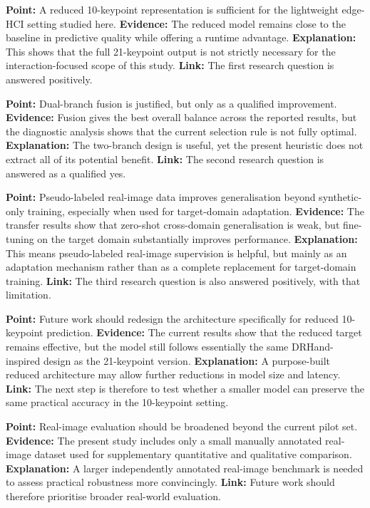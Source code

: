 \documentclass[10pt,letterpaper]{article}
\begin{document}
\noindent\textbf{Point:} A reduced 10-keypoint representation is sufficient for the lightweight edge-HCI setting studied here.
\textbf{Evidence:} The reduced model remains close to the baseline in predictive quality while offering a runtime advantage.
\textbf{Explanation:} This shows that the full 21-keypoint output is not strictly necessary for the interaction-focused scope of this study.
\textbf{Link:} The first research question is answered positively.

\medskip
\noindent\textbf{Point:} Dual-branch fusion is justified, but only as a qualified improvement.
\textbf{Evidence:} Fusion gives the best overall balance across the reported results, but the diagnostic analysis shows that the current selection rule is not fully optimal.
\textbf{Explanation:} The two-branch design is useful, yet the present heuristic does not extract all of its potential benefit.
\textbf{Link:} The second research question is answered as a qualified yes.

\medskip
\noindent\textbf{Point:} Pseudo-labeled real-image data improves generalisation beyond synthetic-only training, especially when used for target-domain adaptation.
\textbf{Evidence:} The transfer results show that zero-shot cross-domain generalisation is weak, but fine-tuning on the target domain substantially improves performance.
\textbf{Explanation:} This means pseudo-labeled real-image supervision is helpful, but mainly as an adaptation mechanism rather than as a complete replacement for target-domain training.
\textbf{Link:} The third research question is also answered positively, with that limitation.

\medskip
\noindent\textbf{Point:} Future work should redesign the architecture specifically for reduced 10-keypoint prediction.
\textbf{Evidence:} The current results show that the reduced target remains effective, but the model still follows essentially the same DRHand-inspired design as the 21-keypoint version.
\textbf{Explanation:} A purpose-built reduced architecture may allow further reductions in model size and latency.
\textbf{Link:} The next step is therefore to test whether a smaller model can preserve the same practical accuracy in the 10-keypoint setting.

\medskip
\noindent\textbf{Point:} Real-image evaluation should be broadened beyond the current pilot set.
\textbf{Evidence:} The present study includes only a small manually annotated real-image dataset used for supplementary quantitative and qualitative comparison.
\textbf{Explanation:} A larger independently annotated real-image benchmark is needed to assess practical robustness more convincingly.
\textbf{Link:} Future work should therefore prioritise broader real-world evaluation.
\end{document}
